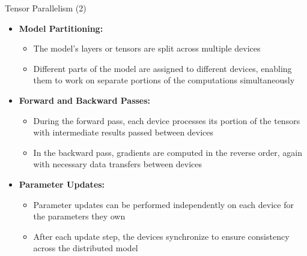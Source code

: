 \documentclass[11pt,compress,t,notes=noshow, xcolor=table]{beamer}
\begin{document}

\begin{vbframe}{Tensor Parallelism (2)}

\begin{itemize}
    \item \textbf{Model Partitioning:}
    \begin{itemize}
        \item The model's layers or tensors are split across multiple devices
        \item Different parts of the model are assigned to different devices, enabling them to work on separate portions of the computations simultaneously
    \end{itemize}
    
    \item \textbf{Forward and Backward Passes:}
    \begin{itemize}
        \item During the forward pass, each device processes its portion of the tensors with intermediate results passed between devices
        \item In the backward pass, gradients are computed in the reverse order, again with necessary data transfers between devices
    \end{itemize}    
    \item \textbf{Parameter Updates:}
    \begin{itemize}
        \item Parameter updates can be performed independently on each device for the parameters they own
        \item After each update step, the devices synchronize to ensure consistency across the distributed model
    \end{itemize}
\end{itemize}
    
\end{vbframe}





  
\end{document}
